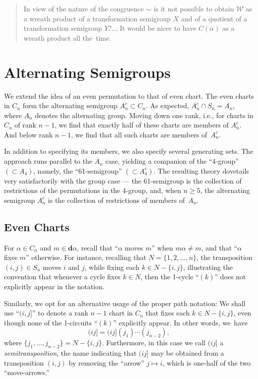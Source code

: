 \documentclass{surv-l}
\numberwithin{equation}{section}
\numberwithin{table}{section}
\numberwithin{figure}{section}
\theoremstyle{plain}
\theoremstyle{definition}
\begin{document}
\begin{quote}
\quad In view of the nature of the congruence $\sim$ is it not possible
to obtain $\mathcal{W}$ as a wreath product of a transformation
semigroup $X$ and of a quotient of a transformation semigroup $Y? \ldots$
It would be nicer to have $C(\alpha)$ as a wreath product
all the~time.
\end{quote}

\chapter{Alternating Semigroups}\label{chap6}

We extend the idea of an even permutation to that of even chart.
The even charts in $C_{n}$ form the
alternating semigroup
$A_{n}^{c}\subset C_{n}$. As expected, $A_{n}^{c}\cap
S_{n}=A_{n}$, where $A_{n}$ denotes the alternating group. Moving
down one rank, i.e., for charts in $C_{n}$ of rank $n -1$, we find
that exactly half of these charts are members of $A_{n}^{c}$. And
below rank $n-1$, we find that all such charts are members
of~$A_{n}^{c}$.

In addition to specifying its members, we also specify several
generating sets. The approach runs parallel to the $A_{n}$ case,
yielding a companion of the ``4-group'' $(\subset A_{4})$, namely,
the ``61-semigroup'' $(\subset A_{4}^{c})$. The resulting theory
dovetails very satisfactorily with the group case --- the
61-semigroup is the collection of restrictions of the permutations
in the 4-group, and, when $n \geq 5$, the alternating semigroup
$A_{n}^{c}$ is the collection of restrictions of members
of~$A_{n}$.

\setcounter{section}{23}
\section{Even Charts}\label{sec6.24}

For $\alpha\in C_{n}$ and $m\in \mathbf{d}\alpha$, recall that
``$\alpha$ moves $m$'' when $m\alpha\neq m$, and that ``$\alpha$
fixes $m$'' otherwise. For instance, recalling that
$N=\{1,2,\ldots, n\}$, the transposition $(i,j)\in S_{n}$ moves
$i$ and $j$, while fixing each $k\in N-\{i,j\}$, illustrating the
convention that whenever a cycle fixes $k\in N$, then the 1-cycle
``$(k)$'' does not explicitly appear in the notation.

Similarly, we opt for an alternative usage of the proper path
notation: We shall use ``$(i, j]$'' to denote a rank $n-1$ chart
in $C_{n}$ that fixes each $k\in N-\{i, j\}$, even though none of
the 1-circuits ``$(k)$'' explicitly appear. In other words,
we~have
\[
(ij]=(ij](j_{1})\cdots(j_{n-2}),
\]
where $\{j_{1},\ldots,j_{n-2}\}=N-\{i, j\}$. Furthermore, in this
case we call $(ij]$ a
\emph{semitransposition}, the name
indicating that $(ij]$ may be obtained from a transposition
$(i,j)$ by removing the ``arrow'' $j\mapsto i$, which is one-half
of the two ``move-arrows.''
\end{document}
